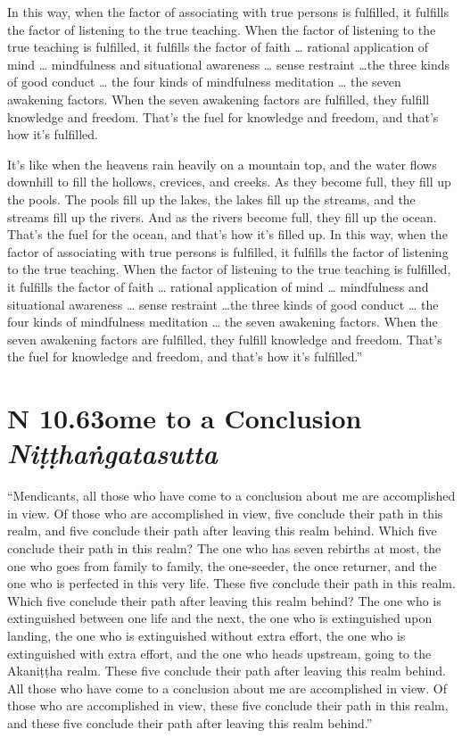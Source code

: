 \documentclass[12pt,openany]{book}%
\newcommand*{\suttatitleacronym}[1]{\smaller[2]{#1}\vspace*{.3em}}
\newcommand*{\suttatitletranslation}[1]{\linebreak{#1}}
\newcommand*{\suttatitleroot}[1]{\linebreak\smaller[2]\itshape{#1}}
\newcommand*{\tocacronym}[1]{\hspace*{-3.3em}{#1}\quad}
\newcommand*{\toctranslation}[1]{#1}
\newcommand*{\tocroot}[1]{(\textit{#1})}
\begin{document}
In this way, when the factor of associating with true persons is fulfilled, it fulfills the factor of listening to the true teaching. When the factor of listening to the true teaching is fulfilled, it fulfills the factor of faith … rational application of mind … mindfulness and situational awareness … sense restraint …the three kinds of good conduct … the four kinds of mindfulness meditation … the seven awakening factors. When the seven awakening factors are fulfilled, they fulfill knowledge and freedom. That’s the fuel for knowledge and freedom, and that’s how it’s fulfilled. 

It’s like when the heavens rain heavily on a mountain top, and the water flows downhill to fill the hollows, crevices, and creeks. As they become full, they fill up the pools. The pools fill up the lakes, the lakes fill up the streams, and the streams fill up the rivers. And as the rivers become full, they fill up the ocean. That’s the fuel for the ocean, and that’s how it’s filled up. In this way, when the factor of associating with true persons is fulfilled, it fulfills the factor of listening to the true teaching. When the factor of listening to the true teaching is fulfilled, it fulfills the factor of faith … rational application of mind … mindfulness and situational awareness … sense restraint …the three kinds of good conduct … the four kinds of mindfulness meditation … the seven awakening factors. When the seven awakening factors are fulfilled, they fulfill knowledge and freedom. That’s the fuel for knowledge and freedom, and that’s how it’s fulfilled.” 

%
\section*{{\suttatitleacronym AN 10.63}{\suttatitletranslation Come to a Conclusion }{\suttatitleroot Niṭṭhaṅgatasutta}}
\addcontentsline{toc}{section}{\tocacronym{AN 10.63} \toctranslation{Come to a Conclusion } \tocroot{Niṭṭhaṅgatasutta}}

“Mendicants, all those who have come to a conclusion about me are accomplished in view. Of those who are accomplished in view, five conclude their path in this realm, and five conclude their path after leaving this realm behind. Which five conclude their path in this realm? The one who has seven rebirths at most, the one who goes from family to family, the one-seeder, the once returner, and the one who is perfected in this very life. These five conclude their path in this realm. Which five conclude their path after leaving this realm behind? The one who is extinguished between one life and the next, the one who is extinguished upon landing, the one who is extinguished without extra effort, the one who is extinguished with extra effort, and the one who heads upstream, going to the \textsanskrit{Akaniṭṭha} realm. These five conclude their path after leaving this realm behind. All those who have come to a conclusion about me are accomplished in view. Of those who are accomplished in view, these five conclude their path in this realm, and these five conclude their path after leaving this realm behind.” 
\end{document}

